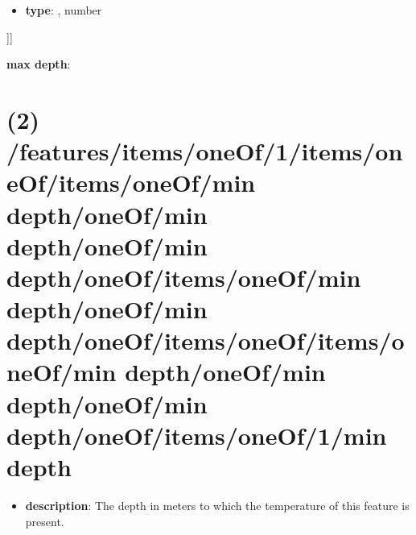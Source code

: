 \begin{itemize}[leftmargin=7em]\item {\bf type}: , number\end{itemize}]]\item {\bf max depth}: \section{(2) /features/items/oneOf/1/items/oneOf/items/oneOf/min depth/oneOf/min depth/oneOf/min depth/oneOf/items/oneOf/min depth/oneOf/min depth/oneOf/items/oneOf/items/oneOf/min depth/oneOf/min depth/oneOf/min depth/oneOf/items/oneOf/1/min depth}
\begin{itemize}[leftmargin=2em]\item {\bf description}: The depth in meters to which the temperature of this feature is present.
\end{itemize}
